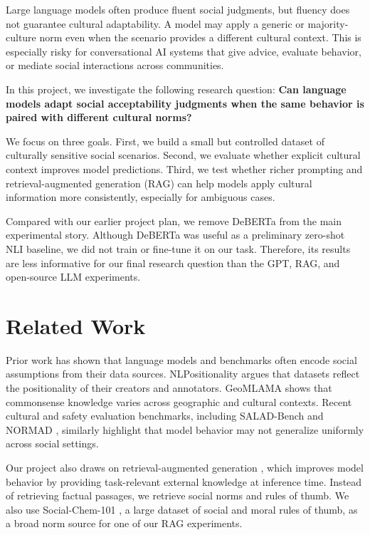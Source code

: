 Large language models often produce fluent social judgments, but fluency does not guarantee cultural adaptability. A model may apply a generic or majority-culture norm even when the scenario provides a different cultural context. This is especially risky for conversational AI systems that give advice, evaluate behavior, or mediate social interactions across communities.

In this project, we investigate the following research question: \textbf{Can language models adapt social acceptability judgments when the same behavior is paired with different cultural norms?}

We focus on three goals. First, we build a small but controlled dataset of culturally sensitive social scenarios. Second, we evaluate whether explicit cultural context improves model predictions. Third, we test whether richer prompting and retrieval-augmented generation (RAG) can help models apply cultural information more consistently, especially for ambiguous cases.

Compared with our earlier project plan, we remove DeBERTa from the main experimental story. Although DeBERTa was useful as a preliminary zero-shot NLI baseline, we did not train or fine-tune it on our task. Therefore, its results are less informative for our final research question than the GPT, RAG, and open-source LLM experiments.

\section{Related Work}

Prior work has shown that language models and benchmarks often encode social assumptions from their data sources. NLPositionality \citep{nlpositionality} argues that datasets reflect the positionality of their creators and annotators. GeoMLAMA \citep{geomlama} shows that commonsense knowledge varies across geographic and cultural contexts. Recent cultural and safety evaluation benchmarks, including SALAD-Bench \citep{saladbench} and NORMAD \citep{normad}, similarly highlight that model behavior may not generalize uniformly across social settings.

Our project also draws on retrieval-augmented generation \citep{rag}, which improves model behavior by providing task-relevant external knowledge at inference time. Instead of retrieving factual passages, we retrieve social norms and rules of thumb. We also use Social-Chem-101 \citep{socialchem101}, a large dataset of social and moral rules of thumb, as a broad norm source for one of our RAG experiments.

